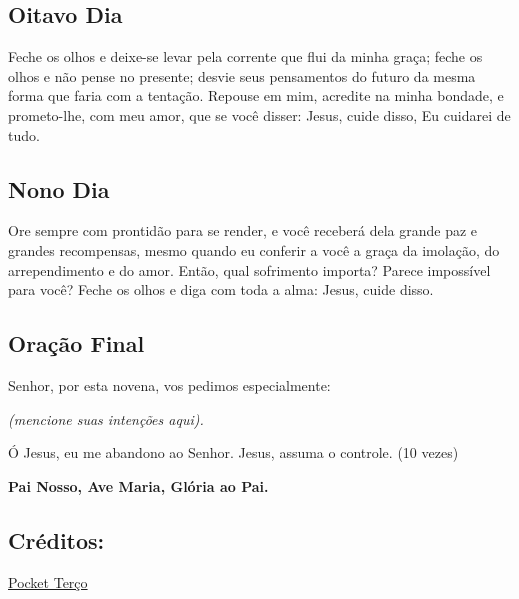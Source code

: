 \documentclass[18pt]{article}
\begin{document}
\textbf{}

\subsection{Oitavo Dia}
\textbf{}

Feche os olhos e deixe-se levar pela corrente que flui da minha graça; feche os olhos e não pense no presente; desvie seus pensamentos do futuro da mesma forma que faria com a tentação. Repouse em mim, acredite na minha bondade, e prometo-lhe, com meu amor, que se você disser: Jesus, cuide disso, Eu cuidarei de tudo.

\textbf{}

\subsection{Nono Dia}
\textbf{}

Ore sempre com prontidão para se render, e você receberá dela grande paz e grandes recompensas, mesmo quando eu conferir a você a graça da imolação, do arrependimento e do amor. Então, qual sofrimento importa? Parece impossível para você? Feche os olhos e diga com toda a alma: Jesus, cuide disso.


\subsection{Oração Final}\label{sec:Oração_Final} %
Senhor, por esta novena, vos pedimos especialmente: 

\textit{(mencione suas intenções aqui).}

Ó Jesus, eu me abandono ao Senhor. Jesus, assuma o controle. (10 vezes)

\textbf{Pai Nosso, Ave Maria, Glória ao Pai.}

\subsection*{Créditos:}
\href{https://pocketterco.com.br/terco/novena-do-abandono-a-jesus}{Pocket Terço}
\end{document}

